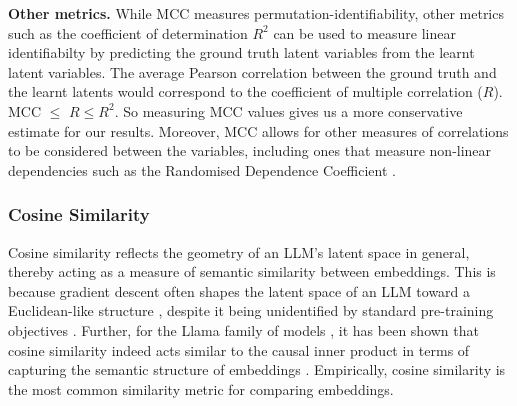 \documentclass{article}
\begin{document}
\textbf{Other metrics.} While MCC measures permutation-identifiability, other metrics such as the coefficient of determination $R^2$ can be used to measure linear identifiabilty by predicting the ground truth latent variables from the learnt latent variables. The average Pearson correlation between the ground truth and the learnt latents would correspond to the coefficient of multiple correlation ($R$). MCC $\leq$  $R\leq R^2$. So measuring MCC values gives us a more conservative estimate for our results. Moreover, MCC allows for other measures of correlations to be considered between the variables, including ones that measure non-linear dependencies such as the Randomised Dependence Coefficient \citep{lopez2013randomized}.

\subsubsection{Cosine Similarity}
\label{apx:cos}
Cosine similarity reflects the geometry of an LLM's latent space in general, thereby acting as a measure of semantic similarity between embeddings. This is because gradient descent often shapes the latent space of an LLM toward a Euclidean-like structure \citep{jiang2024originslinearrepresentationslarge}, despite it being unidentified by standard pre-training objectives \citep{park2023linear}. Further, for the Llama family of models \citep{dubey2024llama3herdmodels}, it has been shown that cosine similarity indeed acts similar to the causal inner product in terms of capturing the semantic structure of embeddings  \citep{park2023linear}. Empirically, cosine similarity is the most common similarity metric for comparing embeddings. 
\end{document}
